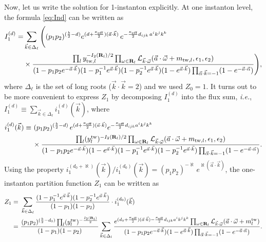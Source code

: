 \documentclass[letterpaper, 11pt]{article}
\newcommand{\nn}{\nonumber}
\def\CL{{\cal L}}
\def\a{\alpha}
\def\e{\epsilon}
\def\k{\kappa}
\def\w{\omega}
\begin{document}
Now, let us write the solution for 1-instanton explicitly. At one instanton level, the formula \eqref{eq:Ind} can be written as
 \begin{align}
  \begin{split}   \label{eq:1inst-i}
  I_1^{(d)} = &\sum_{\vec{k} \in \Delta_\ell}  \Bigg( 
     (p_1p_2)^{(\frac{b}{2}-d ) } e^{(d+\frac{\k_\text{eff}}{2})(\vec{a}\cdot\vec{k})}\,
    e^{-\frac{\k_\text{eff}}{2}d_{ijk}\,a^ik^jk^k}  \\& 
  \times \frac{\prod_{l} y_{\text{tw},l}^{-I_2(\mathbf{R}_l)/2} \prod_{\w \in \mathbf{R}_l} \CL_{\vec{k}\cdot\vec{\w}}(\vec{a}\cdot \vec{\w} + m_{\text{tw},l}, \e_1,\e_2)}{ (1-p_1p_2 e^{-\vec{a} \cdot \vec{k} })(1-p_1^{-1} e^{\vec{a} \cdot \vec{k} })(1-p_2^{-1} e^{\vec{a} \cdot \vec{k} })(1-e^{\vec{a} \cdot \vec{k} })\prod_{\vec{\a} \cdot \vec{k} = -1}(1-e^{-\vec{a}\cdot\vec{\alpha}})}
    \Bigg) , 
  \end{split}
\end{align}
where $\Delta_\ell$ is the set of long roots ($\vec{k}\cdot \vec{k} = 2$) and we used $Z_0 = 1$. 
It turns out to be more convenient to express $Z_1$ by decomposing $I_1^{(d)}$ into the flux sum, \emph{i.e.}, $I_1^{(d)} \equiv \sum_{\vec{k}\in\Delta_{\ell}} i_1^{(d)}(\vec{k})$, where
\begin{align}
  \label{eq:1inst-i-flux}
  \begin{split}
  i_{1}^{(d)}(\vec{k})\equiv &\ (p_1p_2)^{(\frac{b}{2}-d)}\,e^{(d+\frac{\kappa_{\text{eff}}}{2})(\vec{a}\cdot\vec{k})}e^{-\frac{\kappa_{\text{eff}}}{2}d_{ijk}a^ik^jk^k}\\
  &\,\times\frac{\prod_{l}(y_{l}^{\text{tw}})^{-{I_2(\mathbf{R}_l)}/{2}}\prod_{\w \in \mathbf{R}_l} \CL_{\vec{k}\cdot\vec{\w}}(\vec{a}\cdot \vec{\w} + m_{\text{tw},l}, \e_1,\e_2)}{(1-p_1p_2e^{-\vec{a}\cdot\vec{k}})(1-e^{\vec{a}\cdot\vec{k}})(1-p_1^{-1}e^{\vec{a}\cdot\vec{k}})(1-p_2^{-1}e^{\vec{a}\cdot\vec{k}})\prod_{\vec{\alpha}\cdot \vec{k}=-1}(1-e^{-\vec{a}\cdot\vec{\alpha}})}.
  \end{split}
\end{align}
Using the property $i_{1}^{(d_0+\aleph)}(\vec{k}) /i_{1}^{(d_0)}(\vec{k})=(p_1p_2)^{-\aleph}\,e^{\aleph(\vec{a}\cdot\vec{k})}$, the one-instanton partition function $Z_1$ can be written as
\begin{align}
  \label{eq:1inst-formula}
  Z_1=&\ \sum_{\vec{k}\in\Delta_\ell}\frac{(1-p_1^{-1}e^{\vec{a}\cdot\vec{k}})(1-p_2^{-1}e^{\vec{a}\cdot\vec{k}})}{(1-p_1)(1-p_2)}
  \cdot i_1^{(d_0)}(\vec{k}) 
   \\=&\ \frac{(p_1p_2)^{(\frac{b}{2}-d_0)}\prod_{l}(y_{l}^{\text{tw}})^{-{\frac{I_2(\mathbf{R}_l)}{2}}}}{(1-p_1)(1-p_2)} \sum_{\vec{k}\in\Delta_l}\frac{e^{(d_0+\frac{\kappa_{\text{eff}}}{2})(\vec{a}\cdot\vec{k})-\frac{\kappa_{\text{eff}}}{2}d_{ijk}a^ik^jk^k}\prod_{\w \in \mathbf{R}_l} \CL_{\vec{k}\cdot\vec{\w}}(\vec{a}\cdot \vec{\w} + m_{l}^\text{tw})}{(1-p_1p_2e^{-\vec{a}\cdot\vec{k}})(1-e^{\vec{a}\cdot\vec{k}})\prod_{\vec{\alpha}\cdot \vec{k}=-1}(1-e^{-\vec{a}\cdot\vec{\alpha}})} . \nn
\end{align}
\end{document}
